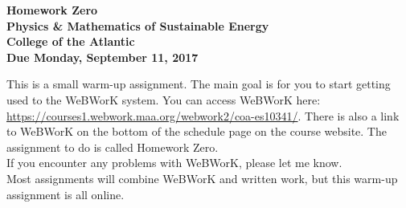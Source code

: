 \documentclass[12pt]{article}
\begin{document}
\pagestyle{empty}
 
\begin{center}
{\Large {\bf Homework Zero}}\\
\smallskip
{\large {\bf Physics \& Mathematics of Sustainable Energy}}\\
\smallskip
{\large {\bf College of the Atlantic}}\\
\smallskip
{ {\bf Due Monday, September 11, 2017}}\\
\end{center}

\medskip
\noindent This is a small warm-up assignment.  The main goal is for
you to start getting used to the WeBWorK system.  You can access
WeBWorK here:
\url{https://courses1.webwork.maa.org/webwork2/coa-es10341/}.  There
is also a link to WeBWorK on the bottom of the schedule page on the
course website.  The assignment to do is called Homework Zero.\\

\noindent If you encounter any problems with WeBWorK, please let me
know. \\

\noindent Most assignments will combine WeBWorK and written work, but
this warm-up assignment is all online. 
\end{document}
